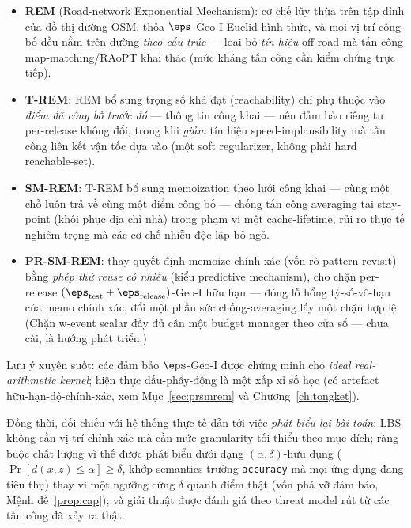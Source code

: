 \begin{itemize}
  \item \textbf{REM} (Road-network Exponential Mechanism): cơ chế lũy thừa trên
  tập đỉnh của đồ thị đường OSM, thỏa $\eps$-Geo-I Euclid hình thức, và mọi vị trí
  công bố đều nằm trên đường \emph{theo cấu trúc} --- loại bỏ \emph{tín hiệu}
  off-road mà tấn công map-matching/RAoPT khai thác (mức kháng tấn công cần kiểm
  chứng trực tiếp).
  \item \textbf{T-REM}: REM bổ sung trọng số khả đạt (reachability) chỉ phụ thuộc
  vào \emph{điểm đã công bố trước đó} --- thông tin công khai --- nên đảm bảo
  riêng tư per-release không đổi, trong khi \emph{giảm} tín hiệu speed-implausibility
  mà tấn công liên kết vận tốc dựa vào (một soft regularizer, không phải hard
  reachable-set).
  \item \textbf{SM-REM}: T-REM bổ sung memoization theo lưới công khai --- cùng
  một chỗ luôn trả về cùng một điểm công bố --- chống tấn công averaging tại
  stay-point (khôi phục địa chỉ nhà) trong phạm vi một cache-lifetime, rủi ro
  thực tế nghiêm trọng mà các cơ chế nhiễu độc lập bỏ ngỏ.
  \item \textbf{PR-SM-REM}: thay quyết định memoize chính xác (vốn rò pattern
  revisit) bằng \emph{phép thử reuse có nhiễu} (kiểu predictive mechanism), cho
  chặn per-release $(\eps_{\text{test}}+\eps_{\text{release}})$-Geo-I hữu hạn ---
  đóng lỗ hổng tỷ-số-vô-hạn của memo chính xác, đổi một phần sức chống-averaging
  lấy một chặn hợp lệ. (Chặn w-event scalar đầy đủ cần một budget manager theo cửa
  sổ --- chưa cài, là hướng phát triển.)
\end{itemize}

Lưu ý xuyên suốt: các đảm bảo $\eps$-Geo-I được chứng minh cho \emph{ideal
real-arithmetic kernel}; hiện thực dấu-phẩy-động là một xấp xỉ số học (có
artefact hữu-hạn-độ-chính-xác, xem Mục~\ref{sec:prsmrem} và
Chương~\ref{ch:tongket}).

Đồng thời, đối chiếu với hệ thống thực tế dẫn tới việc \emph{phát biểu lại bài
toán}: LBS không cần vị trí chính xác mà cần mức granularity tối thiểu theo mục
đích; ràng buộc chất lượng vì thế được phát biểu dưới dạng $(\alpha,\delta)$-hữu
dụng ($\Pr[d(x,z)\le\alpha]\ge\delta$, khớp semantics trường \texttt{accuracy}
mà mọi ứng dụng đang tiêu thụ) thay vì một ngưỡng cứng $\delta$ quanh điểm thật
(vốn phá vỡ đảm bảo, Mệnh đề~\ref{prop:cap}); và giải thuật được đánh giá theo
threat model rút từ các tấn công đã xảy ra thật.

